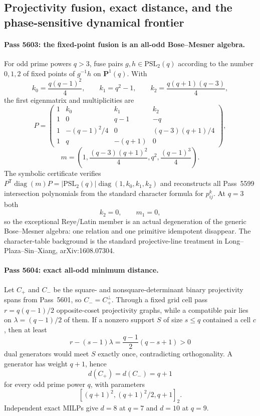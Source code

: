 \subsection{Projectivity fusion, exact distance, and the phase-sensitive dynamical frontier}

\paragraph{Pass 5603: the fixed-point fusion is an all-odd Bose--Mesner algebra.}
For odd prime powers $q>3$, fuse pairs $g,h\in\mathrm{PSL}_2(q)$ according to the
number $0,1,2$ of fixed points of $g^{-1}h$ on $\mathbf P^1(q)$.  With
\[
k_0=\frac{q(q-1)^2}{4},\qquad k_1=q^2-1,\qquad
k_2=\frac{q(q+1)(q-3)}4,
\]
the first eigenmatrix and multiplicities are
\[
\boxed{P=\begin{pmatrix}
1&k_0&k_1&k_2\\
1&0&q-1&-q\\
1&-(q-1)^2/4&0&(q-3)(q+1)/4\\
1&q&-(q+1)&0
\end{pmatrix}},
\]
\[
\boxed{m=\left(1,\frac{(q-3)(q+1)^2}{4},q^2,\frac{(q-1)^3}{4}\right).}
\]
The symbolic certificate verifies
$P^{\mathsf T}\operatorname{diag}(m)P=|\mathrm{PSL}_2(q)|\operatorname{diag}(1,k_0,k_1,k_2)$
and reconstructs all Pass~5599 intersection polynomials from the standard
character formula for $p_{ij}^k$.  At $q=3$ both
\[
\boxed{k_2=0,\qquad m_1=0,}
\]
so the exceptional Reye/Latin member is an actual degeneration of the generic
Bose--Mesner algebra: one relation and one primitive idempotent disappear.
The character-table background is the standard projective-line treatment in
Long--Plaza--Sin--Xiang, arXiv:1608.07304.

\paragraph{Pass 5604: exact all-odd minimum distance.}
Let $C_+$ and $C_-$ be the square- and nonsquare-determinant binary
projectivity spans from Pass~5601, so $C_-=C_+^\perp$.  Through a fixed grid
cell pass $r=q(q-1)/2$ opposite-coset projectivity graphs, while a compatible
pair lies on $\lambda=(q-1)/2$ of them.  If a nonzero support $S$ of size
$s\le q$ contained a cell $c$, then at least
\[
r-(s-1)\lambda=\frac{q-1}{2}(q-s+1)>0
\]
dual generators would meet $S$ exactly once, contradicting orthogonality.
A generator has weight $q+1$, hence
\[
\boxed{d(C_+)=d(C_-)=q+1}
\]
for every odd prime power $q$, with parameters
\[
\boxed{[(q+1)^2,(q+1)^2/2,q+1]_2.}
\]
Independent exact MILPs give $d=8$ at $q=7$ and $d=10$ at $q=9$.


